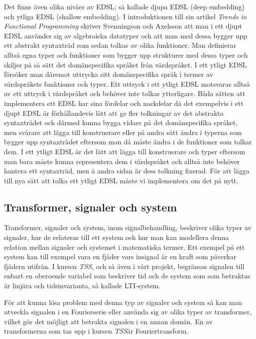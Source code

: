\documentclass[12pt,a4paper,twoside,openright]{article}
\begin{document}
Det finns även olika nivåer av EDSL; så kallade djupa EDSL (deep
embedding) och ytliga EDSL (shallow embedding). I introduktionen till
sin artikel \textit{Trends in Functional Programming} skriver
Svenningson och Axelsson \cite{Svenningsson2013} att man i ett djupt
EDSL använder sig av algebraiska datatyper och att man med dessa
bygger upp ett abstrakt syntaxträd som sedan tolkas av olika
funktioner. Man definierar alltså egna typer och funktioner som bygger
upp strukturer med dessa typer och skiljer på så sätt det
domänspecifika språket från värdspråket. I ett ytligt EDSL försöker
man däremot uttrycka sitt domänspecifika språk i termer av
värdspråkets funktioner och typer. Ett uttryck i ett ytligt EDSL
motsvaras alltså av ett uttryck i värdspråket och behöver inte tolkas
ytterligare. Båda sätten att implementera ett EDSL har sina fördelar
och nackdelar då det exempelvis i ett djupt EDSL är förhållandevis
lätt att ge fler tolkningar av det abstrakta syntaxträdet och därmed
kunna bygga vidare på det domänspecifika språket, men svårare att
lägga till konstruerare eller på andra sätt ändra i typerna som bygger
upp syntaxträdet eftersom man då måste ändra i de funktioner som
tolkar dem. I ett ytligt EDSL är det lätt att lägga till konstruerare
och typer eftersom man bara måste kunna representera dem i värdspråket
och alltså inte behöver hantera ett syntaxträd, men å andra sidan är
dess tolkning fixerad. För att lägga till nya sätt att tolka ett
ytligt EDSL måste vi implementera om det på nytt.

\subsection{Transformer, signaler och system}
Transformer, signaler och system, inom signalbehandling, beskriver
olika typer av signaler, hur de relateras till ett system och hur man
kan modellera denna relation mellan signaler och systemet i
matematiska termer. Ett exempel på ett system kan till exempel vara en
fjäder vars insignal är en kraft som påverkar fjädern utifrån. I
kursen \textit{TSS}, och så även i vårt projekt, begränsas signalen
till enbart en oberoende variabel som beskriver tid och de system som
som betraktas är linjära och tidsinvarianta, så kallade LTI-system.

För att kunna lösa problem med denna typ av signaler och system så kan
man utveckla signalen i en Fourierserie eller använda sig av olika
typer av transformer, vilket gör det möjligt att betrakta signalen i
en annan domän. %
En av transformerna som tas upp i kursen \textit{TSS}är Fouriertransform.
\end{document}
